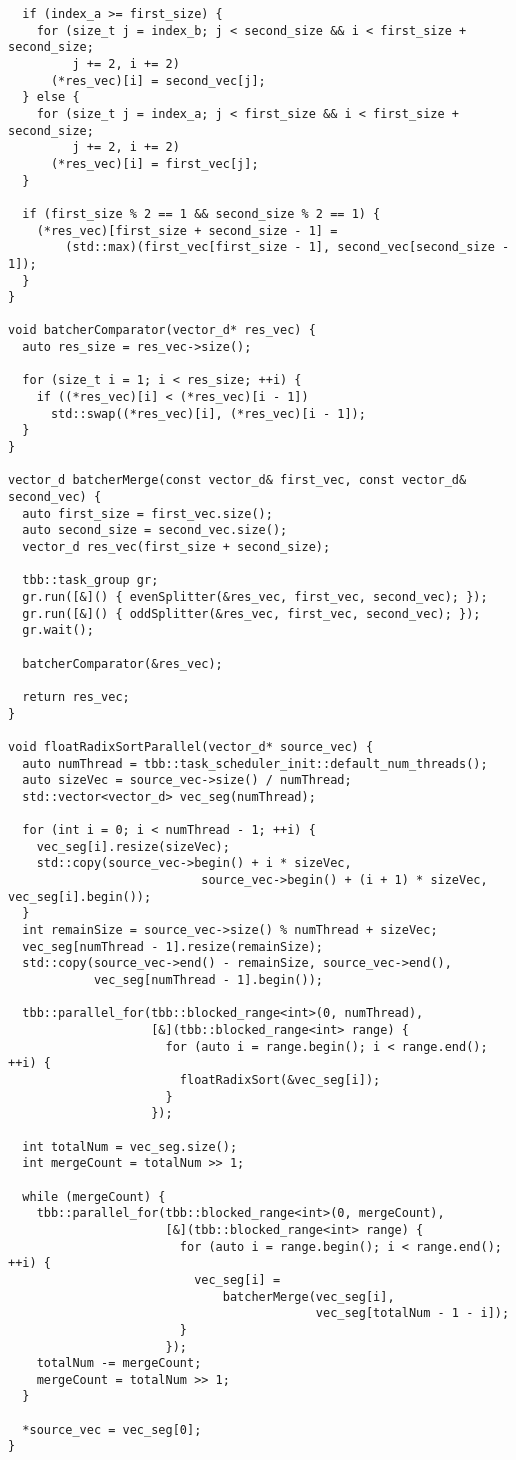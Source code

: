 \documentclass{report}
\begin{document}
\begin{lstlisting}
  if (index_a >= first_size) {
    for (size_t j = index_b; j < second_size && i < first_size + second_size;
         j += 2, i += 2)
      (*res_vec)[i] = second_vec[j];
  } else {
    for (size_t j = index_a; j < first_size && i < first_size + second_size;
         j += 2, i += 2)
      (*res_vec)[i] = first_vec[j];
  }

  if (first_size % 2 == 1 && second_size % 2 == 1) {
    (*res_vec)[first_size + second_size - 1] =
        (std::max)(first_vec[first_size - 1], second_vec[second_size - 1]);
  }
}

void batcherComparator(vector_d* res_vec) {
  auto res_size = res_vec->size();

  for (size_t i = 1; i < res_size; ++i) {
    if ((*res_vec)[i] < (*res_vec)[i - 1])
      std::swap((*res_vec)[i], (*res_vec)[i - 1]);
  }
}

vector_d batcherMerge(const vector_d& first_vec, const vector_d& second_vec) {
  auto first_size = first_vec.size();
  auto second_size = second_vec.size();
  vector_d res_vec(first_size + second_size);

  tbb::task_group gr;
  gr.run([&]() { evenSplitter(&res_vec, first_vec, second_vec); });
  gr.run([&]() { oddSplitter(&res_vec, first_vec, second_vec); });
  gr.wait();

  batcherComparator(&res_vec);

  return res_vec;
}

void floatRadixSortParallel(vector_d* source_vec) {
  auto numThread = tbb::task_scheduler_init::default_num_threads();
  auto sizeVec = source_vec->size() / numThread;
  std::vector<vector_d> vec_seg(numThread);

  for (int i = 0; i < numThread - 1; ++i) {
    vec_seg[i].resize(sizeVec);
    std::copy(source_vec->begin() + i * sizeVec,
                           source_vec->begin() + (i + 1) * sizeVec, vec_seg[i].begin());
  }
  int remainSize = source_vec->size() % numThread + sizeVec;
  vec_seg[numThread - 1].resize(remainSize);
  std::copy(source_vec->end() - remainSize, source_vec->end(),
            vec_seg[numThread - 1].begin());

  tbb::parallel_for(tbb::blocked_range<int>(0, numThread),
                    [&](tbb::blocked_range<int> range) {
                      for (auto i = range.begin(); i < range.end(); ++i) {
                        floatRadixSort(&vec_seg[i]);
                      }
                    });

  int totalNum = vec_seg.size();
  int mergeCount = totalNum >> 1;

  while (mergeCount) {
    tbb::parallel_for(tbb::blocked_range<int>(0, mergeCount),
                      [&](tbb::blocked_range<int> range) {
                        for (auto i = range.begin(); i < range.end(); ++i) {
                          vec_seg[i] =
                              batcherMerge(vec_seg[i],
                                           vec_seg[totalNum - 1 - i]);
                        }
                      });
    totalNum -= mergeCount;
    mergeCount = totalNum >> 1;
  }

  *source_vec = vec_seg[0];
}
\end{lstlisting}
\end{document}
